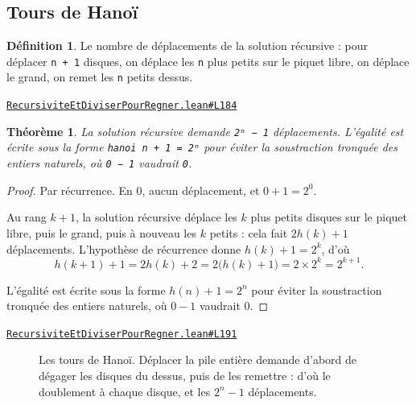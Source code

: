 \documentclass[11pt,a4paper]{article}
\theoremstyle{definition}
\newtheorem{definition}{Définition}
\theoremstyle{plain}
\newtheorem{theoreme}{Théorème}
\newcommand{\source}[2]{\par\smallskip\noindent\hfill{\footnotesize\href{#1}{\texttt{#2}}}\par\smallskip}
\begin{document}
\subsection{Tours de Hanoï}

\begin{definition}
Le nombre de déplacements de la solution récursive : pour déplacer \texttt{n + 1}
disques, on déplace les \texttt{n} plus petits sur le piquet libre, on déplace le grand, on
remet les \texttt{n} petits dessus.
\end{definition}
\source{https://github.com/Commutator-IO/learn-lean/blob/main/courses/02-lycee/11-informatique-nsi/RecursiviteEtDiviserPourRegner.lean\#L184}{RecursiviteEtDiviserPourRegner.lean\#L184}

\begin{theoreme}
La solution récursive demande \texttt{2ⁿ − 1} déplacements. L'égalité est écrite sous la
forme \texttt{hanoi n + 1 = 2ⁿ} pour éviter la soustraction tronquée des entiers naturels,
où \texttt{0 − 1} vaudrait \texttt{0}.
\end{theoreme}
\begin{proof}
Par récurrence. En \(0\), aucun déplacement, et \(0 + 1 = 2^0\).

Au rang \(k+1\), la solution récursive déplace les \(k\) plus petits disques sur le
piquet libre, puis le grand, puis à nouveau les \(k\) petits : cela fait
\(2h(k) + 1\) déplacements. L'hypothèse de récurrence donne \(h(k) + 1 = 2^k\), d'où
\[ h(k+1) + 1 = 2h(k) + 2 = 2\bigl(h(k) + 1\bigr) = 2 \times 2^k = 2^{k+1} . \]

L'égalité est écrite sous la forme \(h(n) + 1 = 2^n\) pour éviter la soustraction
tronquée des entiers naturels, où \(0 - 1\) vaudrait \(0\).
\end{proof}
\source{https://github.com/Commutator-IO/learn-lean/blob/main/courses/02-lycee/11-informatique-nsi/RecursiviteEtDiviserPourRegner.lean\#L191}{RecursiviteEtDiviserPourRegner.lean\#L191}

\begin{figure}[h]
\centering

\caption{Les tours de Hanoï. Déplacer la pile entière demande d'abord de dégager les disques du dessus, puis de les remettre : d'où le doublement à chaque disque, et les $2^n - 1$ déplacements.}
\end{figure}
\end{document}
